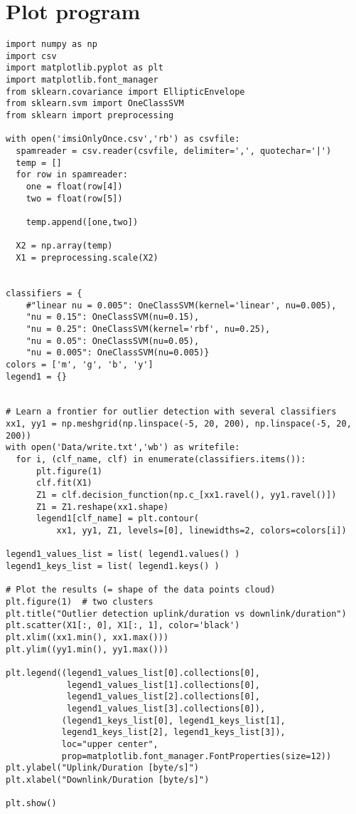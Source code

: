 \chapter{Plot program}
\label{chp:plotprogram}

\begin{Verbatim}
import numpy as np
import csv
import matplotlib.pyplot as plt
import matplotlib.font_manager
from sklearn.covariance import EllipticEnvelope
from sklearn.svm import OneClassSVM
from sklearn import preprocessing

with open('imsiOnlyOnce.csv','rb') as csvfile:
  spamreader = csv.reader(csvfile, delimiter=',', quotechar='|')
  temp = []
  for row in spamreader:
    one = float(row[4])
    two = float(row[5])
   
    temp.append([one,two])
    
  X2 = np.array(temp)
  X1 = preprocessing.scale(X2)


classifiers = {
    #"linear nu = 0.005": OneClassSVM(kernel='linear', nu=0.005),
    "nu = 0.15": OneClassSVM(nu=0.15),
    "nu = 0.25": OneClassSVM(kernel='rbf', nu=0.25),
    "nu = 0.05": OneClassSVM(nu=0.05),
    "nu = 0.005": OneClassSVM(nu=0.005)}
colors = ['m', 'g', 'b', 'y']
legend1 = {}


# Learn a frontier for outlier detection with several classifiers
xx1, yy1 = np.meshgrid(np.linspace(-5, 20, 200), np.linspace(-5, 20, 200))
with open('Data/write.txt','wb') as writefile:
  for i, (clf_name, clf) in enumerate(classifiers.items()):
      plt.figure(1)
      clf.fit(X1)
      Z1 = clf.decision_function(np.c_[xx1.ravel(), yy1.ravel()])
      Z1 = Z1.reshape(xx1.shape)
      legend1[clf_name] = plt.contour(
          xx1, yy1, Z1, levels=[0], linewidths=2, colors=colors[i])
      
legend1_values_list = list( legend1.values() )
legend1_keys_list = list( legend1.keys() )

# Plot the results (= shape of the data points cloud)
plt.figure(1)  # two clusters
plt.title("Outlier detection uplink/duration vs downlink/duration")
plt.scatter(X1[:, 0], X1[:, 1], color='black')
plt.xlim((xx1.min(), xx1.max()))
plt.ylim((yy1.min(), yy1.max()))

plt.legend((legend1_values_list[0].collections[0],
            legend1_values_list[1].collections[0],
            legend1_values_list[2].collections[0],
            legend1_values_list[3].collections[0]),
           (legend1_keys_list[0], legend1_keys_list[1],
           legend1_keys_list[2], legend1_keys_list[3]),
           loc="upper center",
           prop=matplotlib.font_manager.FontProperties(size=12))
plt.ylabel("Uplink/Duration [byte/s]")
plt.xlabel("Downlink/Duration [byte/s]")

plt.show()
\end{Verbatim}